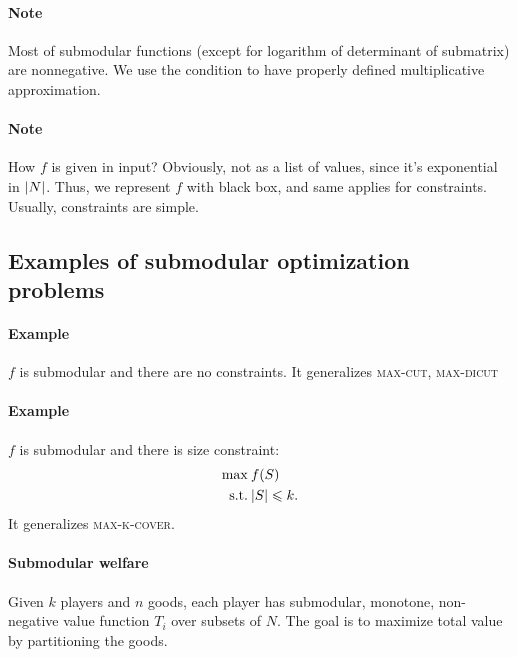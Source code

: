\paragraph{Note} Most of submodular functions (except for logarithm of determinant of submatrix) are nonnegative. We use the condition to have properly defined multiplicative approximation.
\paragraph{Note} How $f$ is given in input? Obviously, not as a list of values, since it's exponential in $\abs{N}$. Thus, we represent $f$ with black box, and same applies for constraints. Usually, constraints are simple. 

\subsection{Examples of submodular optimization problems}
\paragraph{Example}
$f$ is submodular and there are no constraints. It generalizes \textsc{max-cut}, \textsc{max-dicut}
\paragraph{Example}
$f$ is submodular and there is size constraint:
\begin{align}
\max \: & f(S)\\
\text{s.t.} \: & \abs{S} \leqslant k.
\end{align}
It generalizes \textsc{max-k-cover}.

\paragraph{Submodular welfare}
Given $k$ players and $n$ goods, each player has submodular, monotone, non-negative value function $T_i$ over subsets of $N$. The goal is to maximize total value by partitioning the goods.